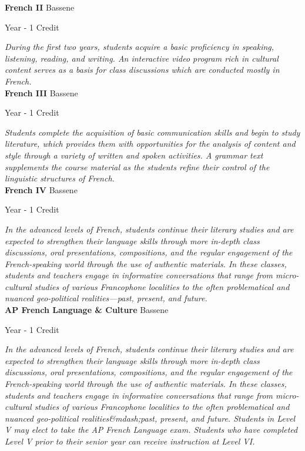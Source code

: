 \noindent\textbf{French II} \hfill Bassene

\noindent Year - 1 Credit

\vspace{1mm}\emph{During the first two years, students acquire a basic proficiency in speaking, listening, reading, and writing.  An interactive video program rich in cultural content serves as a basis for class discussions which are conducted mostly in French.}\\

\noindent\textbf{French III} \hfill Bassene

\noindent Year - 1 Credit

\vspace{1mm}\emph{Students complete the acquisition of basic communication skills and begin to study literature, which provides them with opportunities for the analysis of content and style through a variety of written and spoken activities.  A grammar text supplements the course material as the students refine their control of the linguistic structures of French.}\\

\noindent\textbf{French IV} \hfill Bassene

\noindent Year - 1 Credit

\vspace{1mm}\emph{In the advanced levels of French, students continue their literary studies and are expected to strengthen their language skills through more in-depth class discussions, oral presentations, compositions, and the regular engagement of the French-speaking world through the use of authentic materials.  In these classes, students and teachers engage in informative conversations that range from micro-cultural studies of various Francophone localities to the often problematical and nuanced geo-political realities—past, present, and future.}\\

\noindent\textbf{AP French Language \& Culture} \hfill Bassene

\noindent Year - 1 Credit

\vspace{1mm}\emph{In the advanced levels of French, students continue their literary studies and are expected to strengthen their language skills through more in-depth class discussions, oral presentations, compositions, and the regular engagement of the French-speaking world through the use of authentic materials. In these classes, students and teachers engage in informative conversations that range from micro-cultural studies of various Francophone localities to the often problematical and nuanced geo-political realities\&mdash;past, present, and future. Students in Level V may elect to take the AP French Language exam. Students who have completed Level V prior to their senior year can receive instruction at Level VI.}\\

